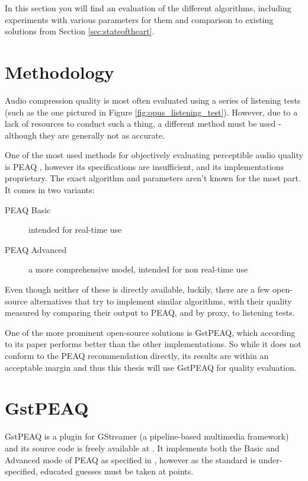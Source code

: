 In this section you will find an evaluation of the different algorithms, including experiments with various parameters for them and comparison to existing solutions from Section \ref{sec:stateoftheart}.

\section{Methodology}
Audio compression quality is most often evaluated using a series of listening tests (such as the one pictured in Figure \ref{fig:opus_listening_test}). However, due to a lack of resources to conduct such a thing, a different method must be used - although they are generally not as accurate.

One of the most used methods for objectively evaluating perceptible audio quality is PEAQ \cite{peaq_2006}, however its specifications are insufficient, and its implementations proprietary. The exact algorithm and parameters aren't known for the most part. It comes in two variants:

\begin{description}
	\item[PEAQ Basic] intended for real-time use
	\item[PEAQ Advanced] a more comprehensive model, intended for non real-time use
\end{description}

Even though neither of these is directly available, luckily, there are a few open-source alternatives that try to implement similar algorithms, with their quality measured by comparing their output to PEAQ, and by proxy, to listening tests.

One of the more prominent open-source solutions is GstPEAQ, which according to its paper \cite{gstpeaq_paper} performs better than the other implementations. So while it does not conform to the PEAQ recommendation directly, its results are within an acceptable margin and thus this thesis will use GstPEAQ for quality evaluation.

\section{GstPEAQ}
GstPEAQ is a plugin for GStreamer \cite{gstreamer_2016} (a pipeline-based multimedia framework) and its source code is freely available at \cite{gstpeaq_paper}. It implements both the Basic and Advanced mode of PEAQ as specified in \cite{peaq_2006}, however as the standard is under-specified, educated guesses must be taken at points.

